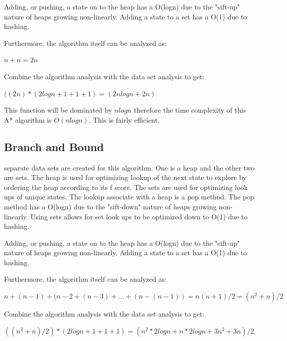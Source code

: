 \documentclass[12pt, letterpaper, final, onecolumn, titlepage] {article}
\begin{document}
\noindent Adding, or pushing, a state on to the heap has a O(logn) due to the "sift-up" nature of heaps growing non-linearly. Adding a state to a set has a O(1) due to hashing.

\noindent Furthermore, the algorithm itself can be analyzed as:

\begin{math}
n + n = 2n
\end{math}

\noindent Combine the algorithm analysis with the data set analysis to get:

\begin{math}
((2n) * (2logn + 1 + 1 + 1) = (2nlogn + 2n)
\end{math}

\noindent This function will be dominated by \begin{math} nlogn \end{math} therefore the time complexity of this A* algorithm is \begin{math} O(nlogn) \end{math}. This is fairly efficient.

\newpage
\subsection{Branch and Bound}
 separate data sets are created for this algorithm.  One is a heap and the other two are sets.  The heap is used for optimizing lookup of the next state to explore by ordering the heap according to its f score.  The sets are used for optimizing look ups of unique states.  The lookup associate with a heap is a pop method.  The pop method has a O(logn) due to the "sift-down" nature of heaps growing non-linearly.  Using sets allows for set look ups to be optimized down to O(1) due to hashing.  

\noindent Adding, or pushing, a state on to the heap has a O(logn) due to the "sift-up" nature of heaps growing non-linearly. Adding a state to a set has a O(1) due to hashing.

\noindent Furthermore, the algorithm itself can be analyzed as:

\begin{math}
n + (n-1) + (n-2 + (n-3) + ... + (n-(n-1)) = n(n + 1)/2 = (n^2 + n)/2
\end{math}

\noindent Combine the algorithm analysis with the data set analysis to get:

\begin{math}
((n^2 + n)/2) * (2logn + 1 + 1 + 1) = (n^2*2logn + n*2logn + 3n^2 + 3n)/2
\end{math}
\end{document}
